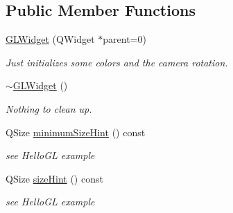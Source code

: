 \subsection*{Public Member Functions}
\begin{DoxyCompactItemize}
\item 
\hyperlink{class_g_l_widget_ab79c391c86de1ffb76f6950b49d82c0c}{GLWidget} (QWidget $\ast$parent=0)
\begin{DoxyCompactList}\small\item\em Just initializes some colors and the camera rotation. \item\end{DoxyCompactList}\item 
\hyperlink{class_g_l_widget_a535192a4262b4501e5493303834f45d3}{$\sim$GLWidget} ()
\begin{DoxyCompactList}\small\item\em Nothing to clean up. \item\end{DoxyCompactList}\item 
QSize \hyperlink{class_g_l_widget_ade3142625c1bfda0576e419b176cf8b1}{minimumSizeHint} () const 
\begin{DoxyCompactList}\small\item\em see HelloGL example \item\end{DoxyCompactList}\item 
QSize \hyperlink{class_g_l_widget_a57698bc426052845b43a135a13540154}{sizeHint} () const 
\begin{DoxyCompactList}\small\item\em see HelloGL example \item\end{DoxyCompactList}\end{DoxyCompactItemize}
